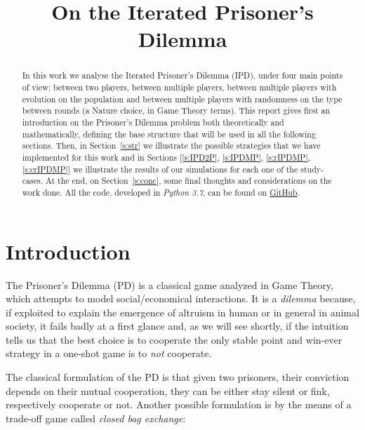 \documentclass[journal,a4paper,10pt,twoside,draft=false]{IEEEtran}
\begin{document}
\title{On the Iterated Prisoner's Dilemma}

\author{%

}

\maketitle

\begin{abstract}
In this work we analyse the Iterated Prisoner's Dilemma (IPD), under four main points of view: between two players, between multiple players, between multiple players with evolution on the population and between multiple players with randomness on the type between rounds (a Nature choice, in Game Theory terms).
This report gives first an introduction on the Prisoner's Dilemma problem both theoretically and mathematically, defining the base structure that will be used in all the following sections.
Then, in Section~\ref{s:str} we illustrate the possible strategies that we have implemented for this work and in Sections [\ref{s:IPD2P}, \ref{s:IPDMP}, \ref{s:rIPDMP}, \ref{s:crIPDMP}] we illustrate the results of our simulations for each one of the study-cases.
At the end, on Section~\ref{s:conc}, some final thoughts and considerations on the work done.
All the code, developed in \textit{Python 3.7}, can be found on \href{https://github.com/eliabntt/LaboratoryOfComputationalPhysics/tree/Group9}{GitHub}.
\end{abstract}

\section{Introduction} 
The Prisoner's Dilemma (PD) is a classical game analyzed in Game Theory, which attempts to model social/economical interactions. It is a \textit{dilemma} because, if exploited to explain the emergence of altruism in human or in general in animal society, it fails badly at a first glance and, as we will see shortly, if the intuition tells us that the best choice is to cooperate the only stable point and win-ever strategy in a one-shot game is to \textit{not} cooperate.

The classical formulation of the PD is that given two prisoners, their conviction depends on their mutual cooperation, they can be either stay silent or fink, respectively cooperate or not. 
Another possible formulation is by the means of a trade-off game called \textit{closed bag exchange}:
\end{document}
